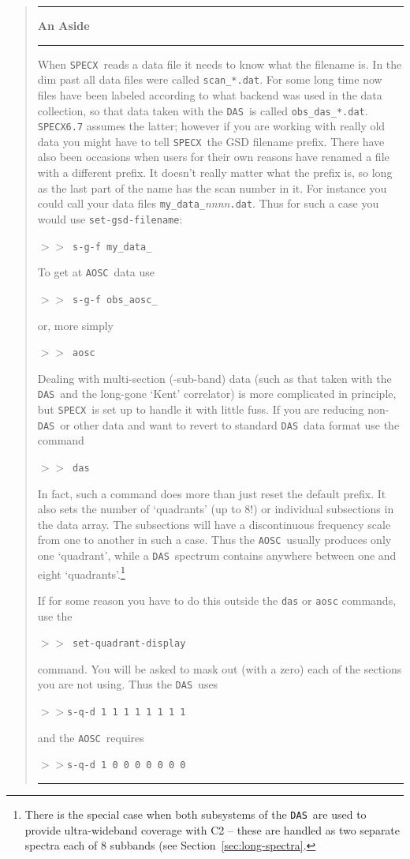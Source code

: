 \documentclass[11pt,twoside]{starlink}
\providecommand{\SPECX}{\texttt{SPECX}}
\providecommand{\das}{\texttt{DAS}}
\providecommand{\aosc}{\texttt{AOSC}}
\providecommand{\SP}{{$>\!>$}}
\newenvironment{aside}{
\begin{quote}\begin{center}\rule[1mm]{1.0in}{0.015in}\hspace*{2mm}
\textbf{An Aside}
\hspace*{2mm}\rule[1mm]{1.0in}{0.015in}\end{center}
}{
\myline
\end{quote}
}
\providecommand{\myline}
{\vspace*{-0.2in}\begin{center}\rule{3.0in}{0.015in}\end{center}}
\begin{document}
\begin{aside}

When \SPECX\ reads a data file it needs to know what the filename is.  In
the dim past all data files were called \texttt{scan\_*.dat}.  For some long
time now files have been labeled according to what backend was used in the
data collection, so that data taken with the \das\ is called \texttt{obs\_das\_*.dat}. \SPECX \texttt{6.7} assumes the latter; however if you are
working with really old data you might have to tell \SPECX\ the GSD
filename prefix. There have also been occasions when users for their own
reasons have renamed a file with a different prefix. It doesn't really
matter what the prefix is, so long as the last part of the name has the
scan number in it. For instance you could call your data files \texttt{my\_data\_}\textit{nnnn}\texttt{.dat}. Thus for such a case you would use \texttt{set-gsd-filename}:

\SP\ \texttt{s-g-f my\_data\_}

To get at \aosc\ data use

\SP\ \texttt{s-g-f obs\_aosc\_}

or, more simply

\SP\ \texttt{aosc}

Dealing with multi-section (-sub-band) data (such as that taken with the
\das\ and the long-gone `Kent' correlator) is more complicated in
principle, but \SPECX\ is set up to handle it with little fuss. If you are
reducing non-\das\ or other data and want to revert to standard \das\ data
format use the command

\SP\ \texttt{das}

In fact, such a command does more than just reset the default prefix. It
also sets the number of `quadrants' (up to 8!) or individual subsections
in the data array. The subsections will have a discontinuous frequency
scale from one to another in such a case. Thus the \aosc\ usually produces
only one `quadrant', while a \das\ spectrum contains anywhere between one
and eight `quadrants'.\footnote{There is the special case when both
subsystems of the \das\ are used to provide ultra-wideband coverage with
C2 -- these are handled as two separate spectra each of 8 subbands (see
Section~\ref{sec:long-spectra}.}

If for some reason you have to do this outside the \texttt{das} or \texttt{aosc} commands, use the

\SP\ \texttt{set-quadrant-display}

command. You will be asked to mask out (with a zero) each of the sections you
are not using. Thus the \das\ uses

\SP \texttt{s-q-d 1 1 1 1 1 1 1 1}

and the \aosc\ requires

\SP \texttt{s-q-d 1 0 0 0 0 0 0 0}
\end{aside}
\end{document}
